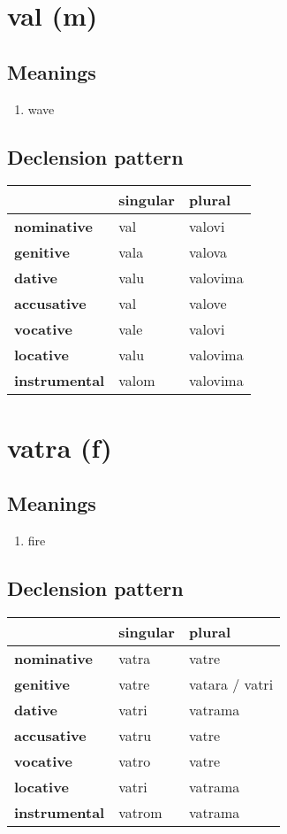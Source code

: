 \filbreak
\section{val (m)}
\subsection*{Meanings}
\begin{enumerate}
\item wave
\end{enumerate}
\subsection*{Declension pattern}
\begin{tabularx}{\linewidth}{Xll}
\toprule
{} & singular &    plural \\
\midrule
\textbf{nominative  } &      val &    valovi \\
\textbf{genitive    } &     vala &    valova \\
\textbf{dative      } &     valu &  valovima \\
\textbf{accusative  } &      val &    valove \\
\textbf{vocative    } &     vale &    valovi \\
\textbf{locative    } &     valu &  valovima \\
\textbf{instrumental} &    valom &  valovima \\
\bottomrule
\end{tabularx}

\filbreak
\section{vatra (f)}
\subsection*{Meanings}
\begin{enumerate}
\item fire
\end{enumerate}
\subsection*{Declension pattern}
\begin{tabularx}{\linewidth}{Xll}
\toprule
{} & singular &          plural \\
\midrule
\textbf{nominative  } &    vatra &           vatre \\
\textbf{genitive    } &    vatre &  vatara / vatri \\
\textbf{dative      } &    vatri &         vatrama \\
\textbf{accusative  } &    vatru &           vatre \\
\textbf{vocative    } &    vatro &           vatre \\
\textbf{locative    } &    vatri &         vatrama \\
\textbf{instrumental} &   vatrom &         vatrama \\
\bottomrule
\end{tabularx}

